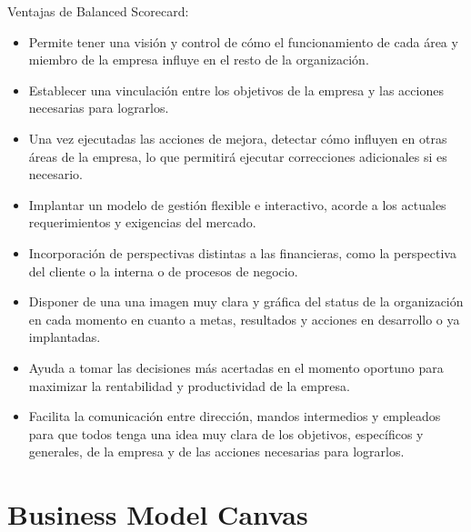 \documentclass[preprint,12pt]{elsarticle}
\begin{document}
Ventajas de Balanced Scorecard:
\begin{itemize}
		\item Permite tener una visión y control de cómo el funcionamiento de cada área y miembro de la empresa influye en el resto de la organización.
		\item Establecer una vinculación entre los objetivos de la empresa y las acciones necesarias para lograrlos.
		\item Una vez ejecutadas las acciones de mejora, detectar cómo influyen en otras áreas de la empresa, lo que permitirá ejecutar correcciones adicionales si es necesario.
		\item Implantar un modelo de gestión flexible e interactivo, acorde a los actuales requerimientos y exigencias del mercado.
		\item Incorporación de perspectivas distintas a las financieras, como la perspectiva del cliente o la interna o de procesos de negocio.
		\item Disponer de una una imagen muy clara y gráfica del status de la organización en cada momento en cuanto a metas, resultados y acciones en desarrollo o ya implantadas.
		\item Ayuda a tomar las decisiones más acertadas en el momento oportuno para maximizar la rentabilidad y productividad de la empresa.
		\item Facilita la comunicación entre dirección, mandos intermedios y empleados para que todos tenga una idea muy clara de los objetivos, específicos y generales, de la empresa y de las acciones necesarias para lograrlos.
	\end{itemize}


	
	
\pagebreak

\section{Business Model Canvas}
	
\end{document}
